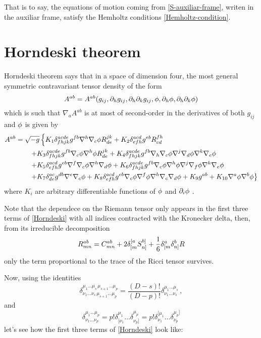 That is to say, the equations of motion coming from \eqref{S-auxiliar-frame}, writen in the auxiliar frame, satisfy the Hemholtz conditions \eqref{Hemholtz-condition}.


\section{Horndeski theorem}
Horndeski theorem says that in a space of dimension four, the most general symmetric contravariant tensor density of the form
\begin{equation}
  A^{ab}=A^{ab}(g_{ij},\partial_hg_{ij},\partial_{h}\partial_k g_{ij},\phi,\partial_h\phi,\partial_h\partial_k\phi )
\end{equation}
which is such that $\nabla_aA^{ab }$ is at most of second-order in the derivatives of both $g_{ij}$ and $\phi$ is given by
\begin{equation}\label{Horndeski}
\begin{split}
  A^{ab}&=\sqrt{-g}\left\{K_1\delta^{acde}_{fhjk}g^{fb}\nabla^h\nabla_c\phi R^{jk}_{de}+K_2\delta^{acd}_{efh}g^{eb}R^{fh}_{cd}\right.\\
  &\left.\qquad +K_3\delta^{acde}_{fhjk}g^{fb}\nabla_c\phi\nabla^h\phi R^{jk}_{de}+K_4\delta^{acde}_{fhjk}g^{fb}\nabla_h\nabla_c\phi \nabla^j\nabla_d\phi \nabla^k\nabla_e\phi \right.\\
  &\left.\qquad +K_5\delta^{acd}_{efh}g^{eb}\nabla^f\nabla_c\phi \nabla^h\nabla_d\phi +K_6\delta^{acde}_{fhjk}g^{fb}\nabla_c\phi \nabla^h\phi \nabla^j\nabla_f\phi \nabla^k\nabla_e\phi \right.\\
  &\left.\qquad +K_7\delta^{ac}_{de}g^{db}\nabla^{e}\nabla_c\phi+K_8\delta^{acd}_{efh}g^{eb}\nabla_c\phi \nabla^f\phi \nabla^h\nabla_c\nabla_d\phi +K_9g^{ab}+K_{10}\nabla^{a}\phi\nabla^b\phi  \right\}
\end{split}
\end{equation}
where $K_i $ are arbitrary differentiable functions of $\phi$ and $\partial_i\phi$ \cite{Horndeski:1974wa}.

Note that the dependece on the Riemann tensor only appears in the first three terms of \eqref{Horndeski} with all indices contracted with the Kronecker delta, then, from its irreducible decomposition
\begin{equation}
  R^{ab}_{mn}=C^{ab}_{mn}+2\delta^{[a}_{[m}S^{b]}_{n]}+\frac{1}{6}\delta^{a}_{[m}\delta^b_{n]}R
\end{equation}
 only the term proportional to the trace of the Ricci tensor survives.
 
 Now, using the identities
\begin{equation}
{\displaystyle \delta _{\nu _{1}\dots \nu _{s}\,\mu _{s+1}\dots \mu _{p}}^{\mu _{1}\dots \mu _{s}\,\mu _{s+1}\dots \mu _{p}}={\frac {(D-s)!}{(D-p)!}}\delta _{\nu _{1}\dots \nu _{s}}^{\mu _{1}\dots \mu _{s}}}\,,
\end{equation}
and
\begin{equation}
  {\displaystyle \delta _{\nu _{1}\dots \nu _{p}}^{\mu _{1}\dots \mu _{p}}=p!\delta _{[\nu _{1}}^{\mu _{1}}\dots \delta _{\nu _{p}]}^{\mu _{p}}=p!\delta _{\nu _{1}}^{[\mu _{1}}\dots \delta _{\nu _{p}}^{\mu _{p}]}}
\end{equation}
 let's see how the first three terms of \eqref{Horndeski} look like:
 
